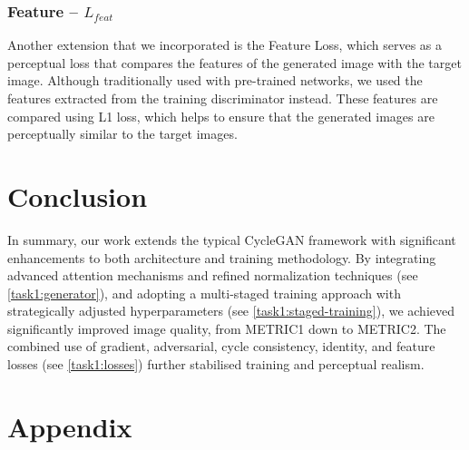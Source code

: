 \documentclass[twoside,english,notitlepage]{report}
\begin{document}
\subsubsection{Feature – $L_{feat}$}
Another extension that we incorporated is the Feature Loss, which serves as a perceptual loss that compares the features of the generated image with the target image. Although traditionally used with pre-trained networks, we used the features extracted from the training discriminator instead. These features are compared using L1 loss, which helps to ensure that the generated images are perceptually similar to the target images. 

\section{Conclusion}
In summary, our work extends the typical CycleGAN framework with significant enhancements to both architecture and training methodology. By integrating advanced attention mechanisms and refined normalization techniques (see \ref{task1:generator}), and adopting a multi-staged training approach with strategically adjusted hyperparameters (see \ref{task1:staged-training}), we achieved significantly improved image quality, from METRIC1 down to METRIC2. The combined use of gradient, adversarial, cycle consistency, identity, and feature losses (see \ref{task1:losses}) further stabilised training and perceptual realism. 

\section{Appendix}\label{task1:appendix}
\end{document}
